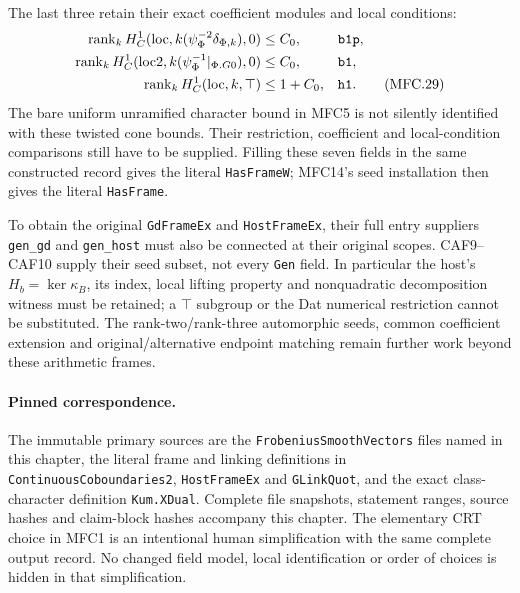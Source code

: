 \documentclass[11pt,a4paper]{article}
\numberwithin{equation}{section}
\theoremstyle{remark}\newtheorem{remark}[theorem]{Remark}
\begin{document}
The last three retain their exact coefficient modules and local
conditions:
\begin{align}
 \operatorname{rank}_k H^1_C(\operatorname{loc},
       k(\psi_\Phi^{-2}\delta_{\Phi,k}),0)&\le C_0,
          &&\texttt{b1p},\notag\\
 \operatorname{rank}_k H^1_C(\operatorname{loc2},
       k(\psi_\Phi^{-1}|_{\Phi.G0}),0)&\le C_0,
          &&\texttt{b1},\notag\\
 \operatorname{rank}_k H^1_C(\operatorname{loc},k,\top)
                                                &\le1+C_0,
          &&\texttt{h1}.                                  \tag{MFC.29}
\end{align}
The bare uniform unramified character bound in MFC5 is not
silently identified with these twisted cone bounds.  Their
restriction, coefficient and local-condition comparisons still
have to be supplied.  Filling these seven fields in the same
constructed record gives the literal \texttt{Has\allowbreak Frame\allowbreak W};
MFC14's seed installation then gives the literal
\texttt{Has\allowbreak Frame}.

To obtain the original \texttt{Gd\allowbreak Frame\allowbreak Ex} and
\texttt{Host\allowbreak Frame\allowbreak Ex}, their full entry suppliers
\texttt{gen\_\allowbreak gd} and \texttt{gen\_\allowbreak host} must also be connected
at their original scopes.  CAF9--CAF10 supply their seed subset,
not every \texttt{Gen} field.  In particular the host's
\(H_b=\ker\kappa_B\), its index, local lifting property
and nonquadratic decomposition witness must be retained; a
\(\top\) subgroup or the Dat numerical restriction cannot
be substituted.  The rank-two/rank-three automorphic seeds,
common coefficient extension and original/alternative endpoint
matching remain further work beyond these arithmetic frames.

\paragraph{Pinned correspondence.}
The immutable primary sources are the \texttt{Frobenius\allowbreak Smooth\allowbreak Vectors}
files named in this chapter, the literal frame and linking definitions
in \texttt{Continuous\allowbreak Coboundaries2}, \texttt{Host\allowbreak Frame\allowbreak Ex} and
\texttt{GLink\allowbreak Quot}, and the exact class-character definition
\texttt{Kum.\allowbreak XDual}.  Complete file snapshots, statement ranges,
source hashes and claim-block hashes accompany this chapter.
The elementary CRT choice in MFC1 is an intentional human
simplification with the same complete output record.  No changed
field model, local identification or order of choices is hidden
in that simplification.
\end{document}
